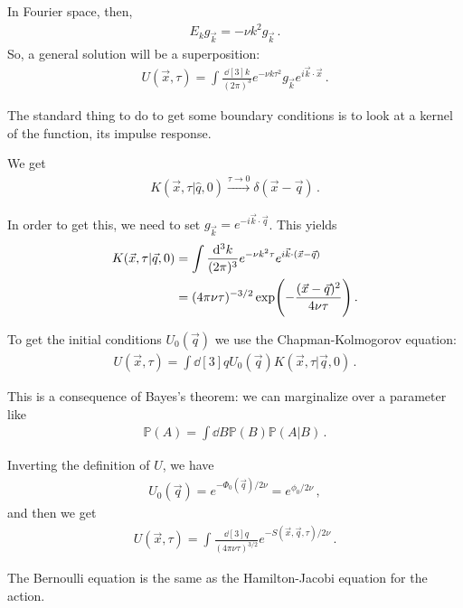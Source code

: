 \documentclass[main.tex]{subfiles}
\begin{document}
In Fourier space, then, 
%
\begin{align}
E_k g_{\vec{k}} = - \nu k^2 g_{\vec{k}}
\,.
\end{align}
%
So, a general solution will be a superposition: 
%
\begin{align}
U(\vec{x}, \tau ) = \int \frac{ \dd[3]{k}}{(2 \pi )^3}
e^{- \nu k \tau^2} g_{\vec{k}} e^{i \vec{k} \cdot \vec{x}}
\,. 
\end{align}

The standard thing to do to get some boundary conditions is to look at a kernel of the function, its impulse response.

We get 
%
\begin{align}
K(\vec{x}, \tau | \hat{q}, 0) \overset{\tau \to 0}{ \to } \delta (\vec{x} - \vec{q})
\,.
\end{align}

In order to get this, we need to set \(g_{\vec{k}} = e^{- i \vec{k} \cdot \vec{q}}\). 
This yields 
%
\begin{align}
K (\vec{x}, \tau | \vec{q}, 0) &=
\int \frac{ \dd[3]{k}}{(2\pi )^3} e^{- \nu k^2\tau } e^{i \vec{k} \cdot \qty(\vec{x} - \vec{q})}  \\
&= (4 \pi \nu \tau )^{-3/2} \exp(- \frac{(\vec{x} - \vec{q})^2}{4 \nu \tau })
\,.
\end{align}

To get the initial conditions \(U_0 (\vec{q})\) we use the Chapman-Kolmogorov equation: 
%
\begin{align}
U(\vec{x}, \tau ) = \int \dd[3]{q} U_0 (\vec{q}) K(\vec{x}, \tau | \vec{q}, 0)
\,.
\end{align}

This is a consequence of Bayes's theorem: we can marginalize over a parameter like
%
\begin{align}
\mathbb{P}(A) = \int \dd{B} \mathbb{P}(B) \mathbb{P}(A | B)
\,.
\end{align}

Inverting the definition of \(U\), we have 
%
\begin{align}
U_0 (\vec{q}) = e^{- \Phi_0 (\vec{q})  / 2 \nu } = e^{ \phi_0 / 2 \nu }
\,,
\end{align}
%
and then we get 
%
\begin{align}
U(\vec{x}, \tau ) = \int \frac{ \dd[3]{q}}{(4 \pi \nu \tau )^{3/2}}
e^{- S(\vec{x}, \vec{q}, \tau )  / 2 \nu }
\,.
\end{align}

The Bernoulli equation is the same as the Hamilton-Jacobi equation for the action.
\end{document}
